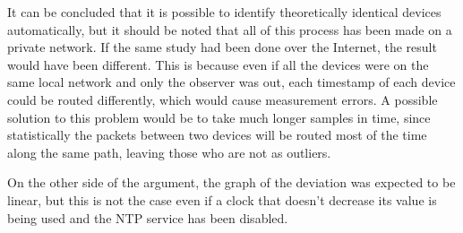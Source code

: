 It can be concluded that it is possible to identify theoretically identical devices automatically, but it should be noted that all of this process has been made on a private network. If the same study had been done over the Internet, the result would have been different. This is because even if all the devices were on the same local network and only the observer was out, each timestamp of each device could be routed differently, which would cause measurement errors. A possible solution to this problem would be to take much longer samples in time, since statistically the packets between two devices will be routed most of the time along the same path, leaving those who are not as outliers. 

On the other side of the argument, the graph of the deviation was expected to be linear, but this is not the case even if a clock that doesn't decrease its value is being used and the NTP service has been disabled.

